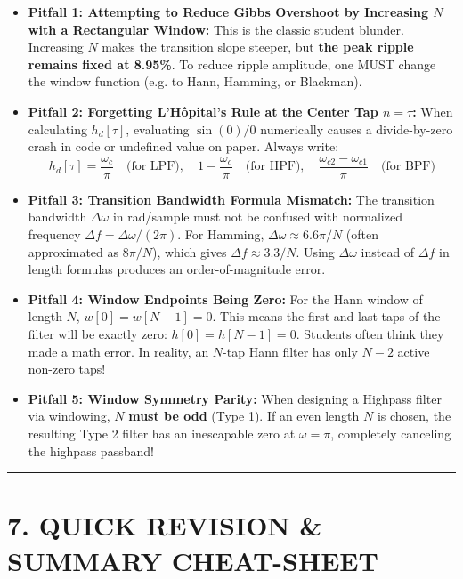 \documentclass[11pt,a4paper]{article}
\begin{document}
\begin{itemize}
    \item \textbf{Pitfall 1: Attempting to Reduce Gibbs Overshoot by Increasing $N$ with a Rectangular Window:}
    This is the classic student blunder. Increasing $N$ makes the transition slope steeper, but \textbf{the peak ripple remains fixed at 8.95\%}. To reduce ripple amplitude, one MUST change the window function (e.g. to Hann, Hamming, or Blackman).
    
    \item \textbf{Pitfall 2: Forgetting L'H\^opital's Rule at the Center Tap $n = \tau$:}
    When calculating $h_d[\tau]$, evaluating $\sin(0)/0$ numerically causes a divide-by-zero crash in code or undefined value on paper. Always write:
    \begin{equation}
    h_d[\tau] = \frac{\omega_c}{\pi} \quad \text{(for LPF)}, \quad 1 - \frac{\omega_c}{\pi} \quad \text{(for HPF)}, \quad \frac{\omega_{c2} - \omega_{c1}}{\pi} \quad \text{(for BPF)}
    \end{equation}
    
    \item \textbf{Pitfall 3: Transition Bandwidth Formula Mismatch:}
    The transition bandwidth $\Delta\omega$ in rad/sample must not be confused with normalized frequency $\Delta f = \Delta\omega / (2\pi)$. For Hamming, $\Delta\omega \approx 6.6\pi/N$ (often approximated as $8\pi/N$), which gives $\Delta f \approx 3.3/N$. Using $\Delta\omega$ instead of $\Delta f$ in length formulas produces an order-of-magnitude error.
    
    \item \textbf{Pitfall 4: Window Endpoints Being Zero:}
    For the Hann window of length $N$, $w[0] = w[N-1] = 0$. This means the first and last taps of the filter will be exactly zero: $h[0] = h[N-1] = 0$. Students often think they made a math error. In reality, an $N$-tap Hann filter has only $N-2$ active non-zero taps!
    
    \item \textbf{Pitfall 5: Window Symmetry Parity:}
    When designing a Highpass filter via windowing, $N$ \textbf{must be odd} (Type 1). If an even length $N$ is chosen, the resulting Type 2 filter has an inescapable zero at $\omega = \pi$, completely canceling the highpass passband!
\end{itemize}

\noindent\rule{\textwidth}{0.5pt}

\section{7. QUICK REVISION \& SUMMARY CHEAT-SHEET}
\end{document}
